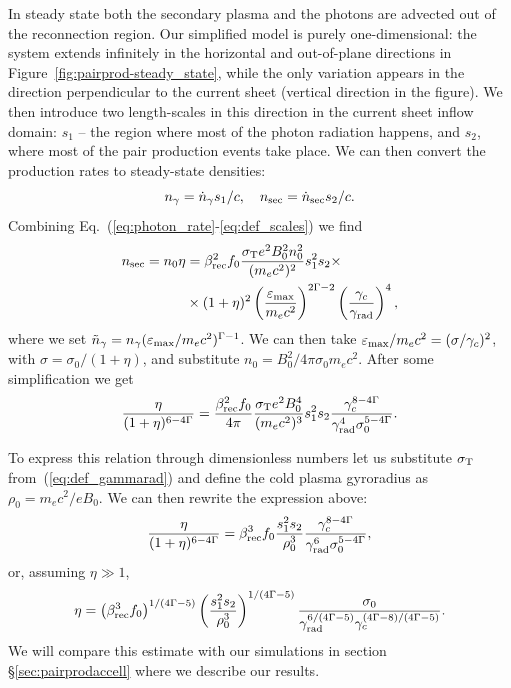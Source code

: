 In steady state both the secondary plasma and the photons are advected out of the reconnection region. Our simplified model is purely one-dimensional: the system extends infinitely in the horizontal and out-of-plane directions in Figure~\ref{fig:pairprod-steady_state}, while the only variation appears in the direction perpendicular to the current sheet (vertical direction in the figure). We then introduce two length-scales in this direction in the current sheet inflow domain: $s_1$ -- the region where most of the photon radiation happens, and $s_2$, where most of the pair production events take place. We can then convert the production rates to steady-state densities:
\begin{equation}\label{eq:def_scales}
    n_\gamma = \dot{n}_{\gamma} s_1 / c,~~~n_{\rm sec} = \dot{n}_{\rm sec} s_2 / c.
\end{equation}
Combining Eq.~(\ref{eq:photon_rate}-\ref{eq:def_scales}) we find
\begin{equation}
\begin{split}
    n_{\rm sec} = n_0 \eta & =
                    \beta_{\rm rec}^2 f_0 \frac{\sigma_{\rm T} e^2 B_0^2 n_0^2}{(m_e c^2)^2} s_1^2 s_2 \times \\
                    & \times (1+\eta)^2\left(\frac{\varepsilon_{\rm max}}{m_e c^2}\right)^{2\Gamma-2}\left(\frac{\gamma_c}{\gamma_{\rm rad}}\right)^4,
\end{split}
\end{equation}
where we set $\tilde{n}_\gamma = n_{\gamma}(\varepsilon_{\rm max}/m_e c^2)^{\Gamma-1}$. We can then take $\varepsilon_{\rm max}/m_e c^2 = (\sigma/\gamma_c)^2$, with $\sigma = \sigma_0 / (1 + \eta)$, and substitute $n_0 = B_0^2 / 4\pi \sigma_0 m_e c^2$. After some simplification we get
\begin{equation}
    \frac{\eta}{(1+\eta)^{6-4\Gamma}} =
            \frac{\beta_{\rm rec}^2 f_0}{4\pi}
            \frac{\sigma_{\rm T} e^2 B_0^4}{(m_e c^2)^3}s_1^2 s_2
            \frac{\gamma_c^{8-4\Gamma}}{\gamma_{\rm rad}^4\sigma_0^{5-4\Gamma}}.
\end{equation}

To express this relation through dimensionless numbers let us substitute $\sigma_{\rm T}$ from~(\ref{eq:def_gammarad}) and define the cold plasma gyroradius as $\rho_0 = m_e c^2 / e B_0$. We can then rewrite the expression above:
\begin{equation}\label{eq:sim_mult_theory}
    \frac{\eta}{(1+\eta)^{6-4\Gamma}} =
            \beta_{\rm rec}^3 f_0
            \frac{s_1^2 s_2}{\rho_0^3}
            \frac{\gamma_c^{8-4\Gamma}}{\gamma_{\rm rad}^6\sigma_0^{5-4\Gamma}},
\end{equation}
or, assuming $\eta \gg 1$,
\begin{equation}\label{eq:sim_mult_theory2}
    \eta = \left(\beta_{\rm rec}^3 f_0\right)^{1/(4\Gamma-5)}
            \left(\frac{s_1^2 s_2}{\rho_0^3}\right)^{1/(4\Gamma-5)}
            \frac{\sigma_0}{\gamma_{\rm rad}^{6/(4\Gamma-5)}\gamma_c^{(4\Gamma-8)/(4\Gamma-5)}}.
\end{equation}
We will compare this estimate with our simulations in section \S\ref{sec:pairprodaccell} where we describe our results.

